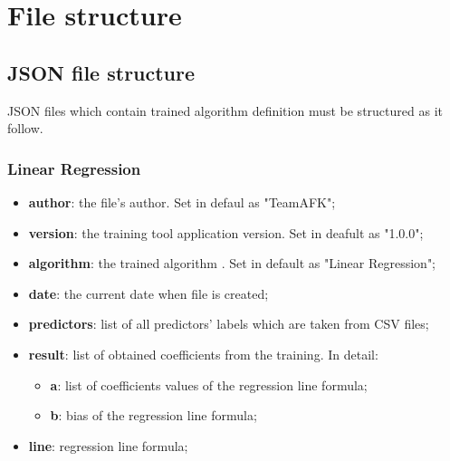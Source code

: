\section{File structure}
	\subsection{JSON file structure}
JSON files which contain trained algorithm definition must be structured as it follow.	

		\subsubsection{Linear Regression}
		\begin{itemize}
			\item\textbf{author}: the file's author. Set in defaul as "TeamAFK";
			\item\textbf{version}: the training tool application version. Set in deafult as "1.0.0";
			\item\textbf{algorithm}: the trained algorithm . Set in default as "Linear Regression"; 	
			\item\textbf{date}: the current date when file is created;
			\item\textbf{predictors}: list of all predictors' labels which are taken from CSV files;
			\item\textbf{result}: list of obtained coefficients from the training. In detail:
			\begin{itemize}
					\item\textbf{a}: list of coefficients values of the regression line formula;
					\item\textbf{b}: bias of the regression line formula;
				\end{itemize}
			\item\textbf{line}: regression line formula;
					
		\end{itemize}
		
